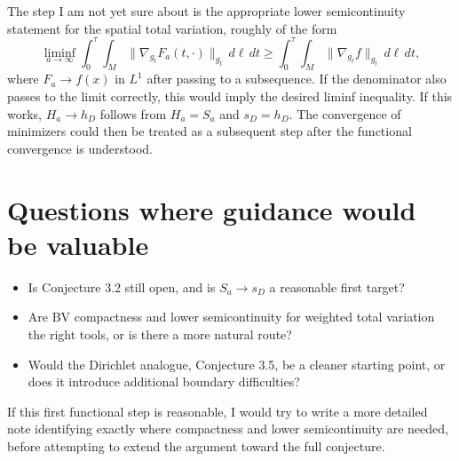 \documentclass[10pt]{article}
\begin{document}
The step I am not yet sure about is the appropriate lower semicontinuity statement for the spatial total variation, roughly of the form
\[
\liminf_{a\to\infty}\int_0^\tau\int_M \|\nabla_{g_t}F_a(t,\cdot)\|_{g_t}\,d\ell\,dt
\ge
\int_0^\tau\int_M \|\nabla_{g_t}f\|_{g_t}\,d\ell\,dt,
\]
where \(F_a\to f(x)\) in \(L^1\) after passing to a subsequence. If the denominator also passes to the limit correctly, this would imply the desired liminf inequality. If this works, \(H_a\to h_D\) follows from \(H_a=S_a\) and \(s_D=h_D\). The convergence of minimizers could then be treated as a subsequent step after the functional convergence is understood.

\section*{Questions where guidance would be valuable}

\begin{itemize}
  \item Is Conjecture 3.2 still open, and is \(S_a\to s_D\) a reasonable first target?
  \item Are BV compactness and lower semicontinuity for weighted total variation the right tools, or is there a more natural route?
  \item Would the Dirichlet analogue, Conjecture 3.5, be a cleaner starting point, or does it introduce additional boundary difficulties?
\end{itemize}

If this first functional step is reasonable, I would try to write a more detailed note identifying exactly where compactness and lower semicontinuity are needed, before attempting to extend the argument toward the full conjecture.
\end{document}
